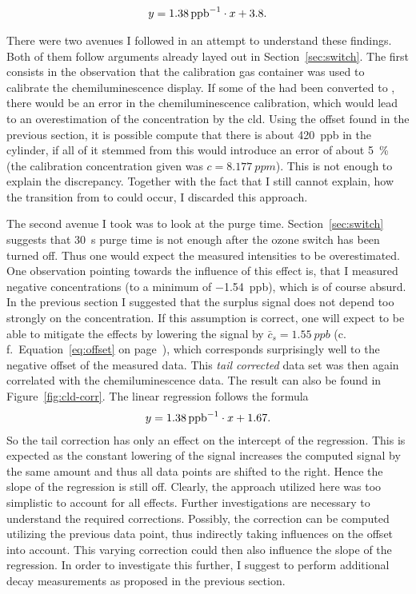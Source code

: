 \begin{align*}
  y = \SI{1.38}{{ppb}\tothe{-1}} \cdot x + 3.8.
\end{align*}

There were two avenues I followed in an attempt to understand these
findings. Both of them follow arguments already layed out in
Section~\ref{sec:switch}. The first consists in the observation that
the  calibration gas container was used to calibrate the
chemiluminescence display. If some of the  had been converted
to , there would be an error in the chemiluminescence
calibration, which would lead to an overestimation of the 
concentration by the cld. Using the  offset found in the
previous section, it is possible compute that there is about
\SI{420}{ppb}  in the cylinder, if all of it stemmed from
 this would introduce an error of about \SI{5}{\percent} (the
calibration concentration given was $c = \SI{8.177}{ppm}$). This is
not enough to explain the discrepancy. Together with the fact that I
still cannot explain, how the transition from  to 
could occur, I discarded this approach.

The second avenue I took was to look at the purge time.
Section~\ref{sec:switch} suggests that \SI{30}{\second} purge time is
not enough after the ozone switch has been turned off. Thus one would
expect the measured  intensities to be overestimated. One
observation pointing towards the influence of this effect is, that I
measured negative  concentrations (to a minimum of
\SI{-1.54}{ppb}), which is of course absurd. In the previous section I
suggested that the surplus  signal does not depend too strongly
on the  concentration. If this assumption is correct, one will
expect to be able to mitigate the effects by lowering the 
signal by $\bar c_s = \SI{1.55}{ppb}$ (c.\,f.\
Equation~\eqref{eq:offset} on page~\pageref{eq:offset}), which
corresponds surprisingly well to the negative offset of the measured
data. This \emph{tail corrected} data set was then again correlated
with the chemiluminescence data. The result can also be found in
Figure~\ref{fig:cld-corr}. The linear regression follows the formula
\begin{align*}
  y = \SI{1.38}{ppb\tothe{-1}} \cdot x + 1.67.
\end{align*}
So the tail correction has only an effect on the intercept of the
regression. This is expected as the constant lowering of the 
signal increases the computed \ch{NO} signal by the same amount and
thus all data points are shifted to the right. Hence the slope of the
regression is still off. Clearly, the approach utilized here was too
simplistic to account for all effects. Further investigations are
necessary to understand the required corrections. Possibly, the
 correction can be computed utilizing the previous 
data point, thus indirectly taking \ch{NO} influences on the offset
into account. This varying \ch{NO2} correction could then also
influence the slope of the regression. In order to investigate this
further, I suggest to perform additional decay measurements as
proposed in the previous section.


